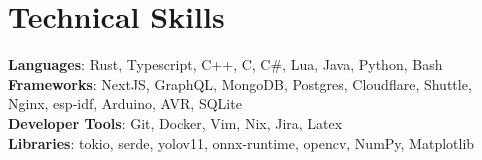 \documentclass[letterpaper,11pt]{article}
\begin{document}
%
\section{Technical Skills}
 \begin{itemize}[leftmargin=0.15in, label={}]
    \small{\item{
     \textbf{Languages}{: Rust, Typescript, C++, C, C\#, Lua, Java, Python, Bash} \\
     \textbf{Frameworks}{: NextJS, GraphQL, MongoDB, Postgres, Cloudflare, Shuttle, Nginx, esp-idf, Arduino, AVR, SQLite} \\
     \textbf{Developer Tools}{: Git, Docker, Vim, Nix, Jira, Latex } \\
     \textbf{Libraries}{: tokio, serde, yolov11, onnx-runtime, opencv, NumPy, Matplotlib}
    }}
 \end{itemize}


\end{document}
